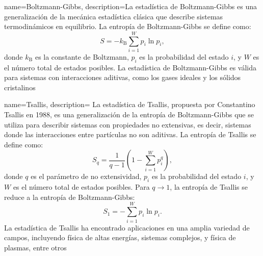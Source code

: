 
{
    name=Boltzmann-Gibbs,
    description={La estadística de Boltzmann-Gibbs es una generalización de la mecánica estadística clásica que describe sistemas termodinámicos en equilibrio. La entropía de Boltzmann-Gibbs se define como:
    \[
        S = -{k}_{\mathrm{B}} \sum_{i=1}^W p_i \ln p_i,
    \]
    donde \( {k}_{\mathrm{B}} \) es la constante de Boltzmann, \( p_i \) es la probabilidad del estado \( i \), y \( W \) es el número total de estados posibles. La estadística de Boltzmann-Gibbs es válida para sistemas con interacciones aditivas, como los gases ideales y los sólidos cristalinos}
}

{
    name=Tsallis,
    description={
        La estadística de Tsallis, propuesta por Constantino Tsallis en 1988, es una generalización de la entropía de Boltzmann-Gibbs que se utiliza para describir sistemas con propiedades no extensivas, es decir, sistemas donde las interacciones entre partículas no son aditivas. La entropía de Tsallis se define como:
        \[
            S_q = \frac{1}{q-1} \left( 1 - \sum_{i=1}^W p_i^q \right),
        \]
        donde \( q \) es el parámetro de no extensividad, \( p_i \) es la probabilidad del estado \( i \), y \( W \) es el número total de estados posibles. Para \( q \to 1 \), la entropía de Tsallis se reduce a la entropía de Boltzmann-Gibbs:
        \[
            S_1 = -\sum_{i=1}^W p_i \ln p_i.
        \]
        La estadística de Tsallis ha encontrado aplicaciones en una amplia variedad de campos, incluyendo física de altas energías, sistemas complejos, y física de plasmas, entre otros}
}


